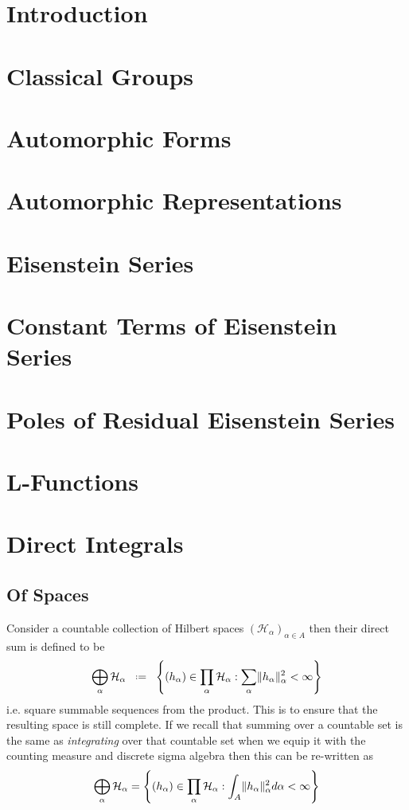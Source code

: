 \documentclass[10pt, openany]{book}
\numberwithin{equation}{section}
\begin{document}
\chapter*{Introduction}


\tableofcontents
{}

\chapter{Classical Groups}

\chapter{Automorphic Forms}

\chapter{Automorphic Representations}

\chapter{Eisenstein Series}

\chapter{Constant Terms of Eisenstein Series}

%
\chapter{Poles of Residual Eisenstein Series}



    \appendix
\chapter{L-Functions}

\chapter{Direct Integrals}\label{A:2}
\section{Of Spaces}
Consider a countable collection of Hilbert spaces \((\mathcal{H}_\alpha)_{\alpha\in A}\) then their direct sum is defined to be 
\[\bigoplus_{\alpha} \mathcal{H}_\alpha \defeq \left\{(h_\alpha)\in \prod_\alpha \mathcal{H}_\alpha : \sum_\alpha \norm{h_\alpha}_\alpha^2 < \infty\right\}\]
i.e. square summable sequences from the product. This is to ensure that the resulting space is still complete. If we recall that summing over a countable set is the same as \textit{integrating} over that countable set when we equip it with the counting measure and discrete sigma algebra then this can be re-written as 
\[\bigoplus_{\alpha} \mathcal{H}_\alpha = \left\{(h_\alpha)\in \prod_\alpha \mathcal{H}_\alpha : \int_A \lVert h_\alpha \rVert^2_\alpha d\alpha < \infty\right\}\]
\end{document}
